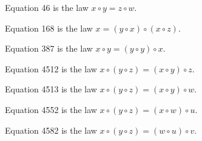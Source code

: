\begin{definition}[Equation 46]\label{eq46}\leanok{}  Equation 46 is the law $x \circ y = z \circ w$.
\end{definition}

\begin{definition}[Equation 168]\label{eq168}\leanok{}  Equation 168 is the law $x = (y \circ x) \circ (x \circ z)$.
\end{definition}

\begin{definition}[Equation 387]\label{eq387}\leanok{}  Equation 387 is the law $x \circ y = (y \circ y) \circ x$.
\end{definition}

\begin{definition}[Equation 4512]\label{eq4512}\leanok{}  Equation 4512 is the law $x \circ (y \circ z) = (x \circ y) \circ z$.
\end{definition}

\begin{definition}[Equation 4513]\label{eq4513}\leanok{}  Equation 4513 is the law $x \circ (y \circ z) = (x \circ y) \circ w$.
\end{definition}

\begin{definition}[Equation 4552]\label{eq4552}\leanok{}  Equation 4552 is the law $x \circ (y \circ z) = (x \circ w) \circ u$.
\end{definition}

\begin{definition}[Equation 4582]\label{eq4582}\leanok{}  Equation 4582 is the law $x \circ (y \circ z) = (w \circ u) \circ v$.
\end{definition}
